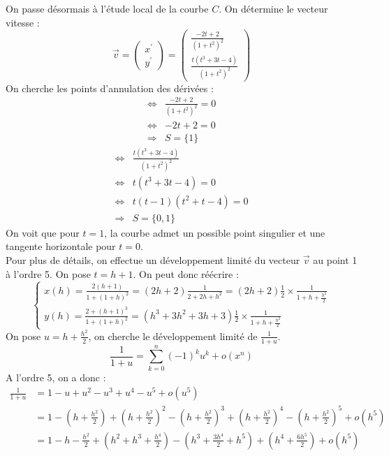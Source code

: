 \begin{ex}
On passe désormais à l'étude local de la courbe $C$.
On détermine le vecteur vitesse :\\
$$\overrightarrow{v}=\begin{pmatrix}x^{\prime}\\y^{\prime}\end{pmatrix}=\begin{pmatrix}\frac{-2t+2}{(1+t^2)^2}\\\frac{t(t^3+3t-4)}{(1+t^2)^2}\end{pmatrix}$$
On cherche les points d'annulation des dérivées :
\begin{align*}
    \Leftrightarrow & \frac{-2t+2}{(1+t^2)^2}=0\\
    \Leftrightarrow & -2t+2=0\\
    \Rightarrow & S=\{1\}
\end{align*}
\begin{align*}
    \Leftrightarrow & \frac{t(t^3+3t-4)}{(1+t^2)^2}\\
    \Leftrightarrow & t(t^3+3t-4)=0\\
    \Leftrightarrow & t(t-1)(t^2+t-4)=0\\
    \Rightarrow & S=\{0,1\}
\end{align*}
On voit que pour $t=1$, la courbe admet un possible point singulier et une tangente horizontale pour $t=0$.\\
Pour plus de détails, on effectue un développement limité du vecteur $\overrightarrow{v}$ au point 1 à l'ordre 5.
On pose $t=h+1$. On peut donc réécrire :
$$\begin{cases}\displaystyle x(h)=\frac{2(h+1)}{1+(1+h)^2}=(2h+2)\frac{1}{2+2h+h^2}=(2h+2)\frac{1}{2}\times\frac{1}{1+h+\frac{h^2}{2}}\\
\displaystyle y(h)=\frac{2+(h+1)^3}{1+(1+h)^2}=(h^3+3h^2+3h+3)\frac{1}{2}\times\frac{1}{1+h+\frac{h^2}{2}}\end{cases}$$
On pose $u=h+\frac{h^2}{2}$, on cherche le développement limité de $\frac{1}{1+u}$.
$$\displaystyle\frac{1}{1+u}=\sum_{k=0}^n(-1)^ku^k+o(x^n)$$
A l'ordre 5, on a donc :  
\begin{align*}
    \frac{1}{1+u}&=1-u+u^2-u^3+u^4-u^5+o(u^5)\\
     &=1-\left(h+\frac{h^2}{2}\right)+\left(h+\frac{h^2}{2}\right)^2-\left(h+\frac{h^2}{2}\right)^3+\left(h+\frac{h^2}{2}\right)^4-\left(h+\frac{h^2}{2}\right)^5+o(h^5)\\
     &=1-h-\frac{h^2}{2}+\left(h^2+h^3+\frac{h^4}{2}\right)-\left(h^3+\frac{3h^4}{2}+h^5\right)+\left(h^4+\frac{6h^5}{2}\right)+o(h^5)\\

\end{align*}
\end{ex}
